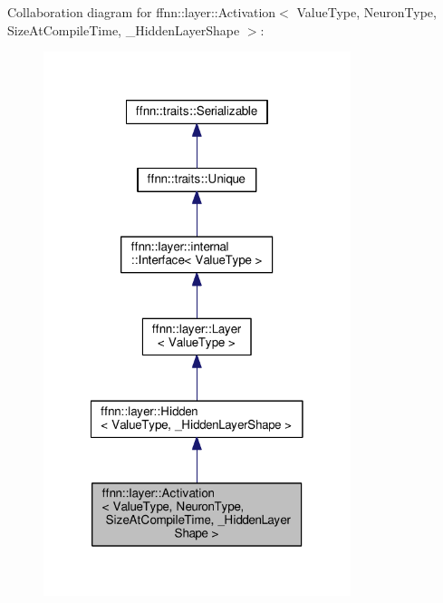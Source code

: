 Collaboration diagram for ffnn\-:\-:layer\-:\-:Activation$<$ Value\-Type, Neuron\-Type, Size\-At\-Compile\-Time, \-\_\-\-Hidden\-Layer\-Shape $>$\-:
\nopagebreak
\begin{figure}[H]
\begin{center}
\leavevmode
\includegraphics[width=254pt]{classffnn_1_1layer_1_1_activation__coll__graph}
\end{center}
\end{figure}
